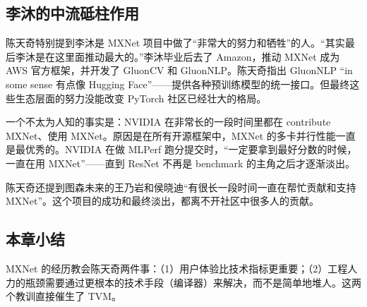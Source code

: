 \subsection{李沐的中流砥柱作用}

陈天奇特别提到李沐是 MXNet 项目中做了``非常大的努力和牺牲''的人。``其实最后李沐是在这里面推动最大的。''李沐毕业后去了 Amazon，推动 MXNet 成为 AWS 官方框架，并开发了 GluonCV 和 GluonNLP。陈天奇指出 GluonNLP ``in some sense 有点像 Hugging Face''------提供各种预训练模型的统一接口。但最终这些生态层面的努力没能改变 PyTorch 社区已经壮大的格局。

一个不太为人知的事实是：NVIDIA 在非常长的一段时间里都在 contribute MXNet、使用 MXNet。原因是在所有开源框架中，MXNet 的多卡并行性能一直是最优秀的。NVIDIA 在做 MLPerf 跑分提交时，``一定要拿到最好分数的时候，一直在用 MXNet''------直到 ResNet 不再是 benchmark 的主角之后才逐渐淡出。

陈天奇还提到图森未来的王乃岩和侯晓迪``有很长一段时间一直在帮忙贡献和支持 MXNet''。这个项目的成功和最终淡出，都离不开社区中很多人的贡献。

\subsection{本章小结}

MXNet 的经历教会陈天奇两件事：（1）用户体验比技术指标更重要；（2）工程人力的瓶颈需要通过更根本的技术手段（编译器）来解决，而不是简单地堆人。这两个教训直接催生了 TVM。


